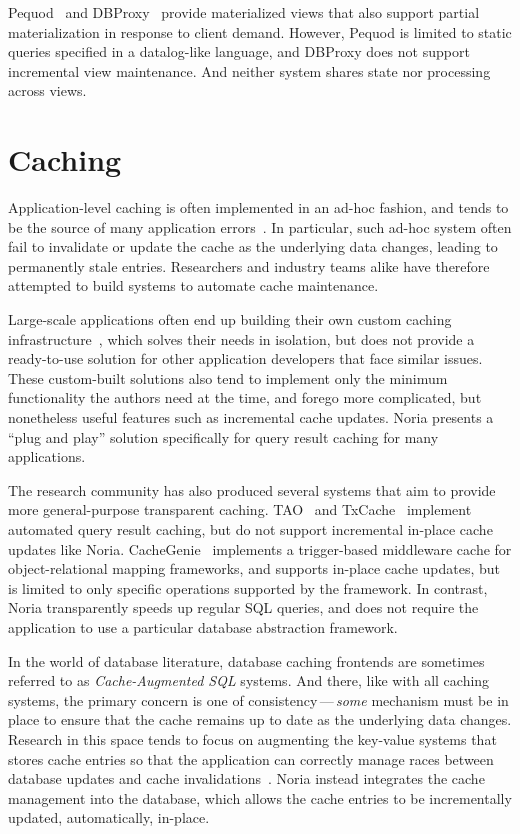 Pequod~\cite{pequod} and DBProxy~\cite{dbproxy} provide materialized views that
also support partial materialization in response to client demand. However,
Pequod is limited to static queries specified in a datalog-like language, and
DBProxy does not support incremental view maintenance. And neither system shares
state nor processing across views.

\section{Caching}

Application-level caching is often implemented in an ad-hoc fashion, and tends
to be the source of many application errors~\cite{ad-hoc-caching}. In
particular, such ad-hoc system often fail to invalidate or update the cache as
the underlying data changes, leading to permanently stale entries. Researchers
and industry teams alike have therefore attempted to build systems to automate
cache maintenance.

Large-scale applications often end up building their own custom caching
infrastructure~\cite{facebook-memcache, flannel}, which solves their needs in
isolation, but does not provide a ready-to-use solution for other application
developers that face similar issues. These custom-built solutions also tend to
implement only the minimum functionality the authors need at the time, and
forego more complicated, but nonetheless useful features such as incremental
cache updates. Noria presents a ``plug and play'' solution specifically for
query result caching for many applications.

The research community has also produced several systems that aim to provide
more general-purpose transparent caching. TAO~\cite{tao} and
TxCache~\cite{txcache} implement automated query result caching, but do not
support incremental in-place cache updates like Noria.
CacheGenie~\cite{cachegenie} implements a trigger-based middleware cache for
object-relational mapping frameworks, and supports in-place cache updates, but
is limited to only specific operations supported by the framework. In contrast,
Noria transparently speeds up regular SQL queries, and does not require the
application to use a particular database abstraction framework.

In the world of database literature, database caching frontends are sometimes
referred to as \textit{Cache-Augmented SQL} systems. And there, like with all
caching systems, the primary concern is one of consistency\,---\,\emph{some}
mechanism must be in place to ensure that the cache remains up to date as the
underlying data changes. Research in this space tends to focus on augmenting the
key-value systems that stores cache entries so that the application can
correctly manage races between database updates and cache
invalidations~\cite{facebook-memcache, casql-consistency,
casql-consistency-thesis}. Noria instead integrates the cache management into
the database, which allows the cache entries to be incrementally updated,
automatically, in-place.

